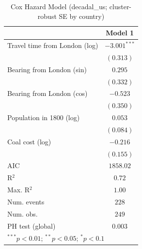 
\begin{table}
\begin{center}
\begin{tabular}{l c}
\hline
 & Model 1 \\
\hline
Travel time from London (log) & $-3.001^{***}$ \\
 & $(0.313)$ \\
Bearing from London (sin) & $0.295$ \\
 & $(0.332)$ \\
Bearing from London (cos) & $-0.523$ \\
 & $(0.350)$ \\
Population in 1800 (log) & $0.053$ \\
 & $(0.084)$ \\
Coal cost (log) & $-0.216$ \\
 & $(0.155)$ \\
\hline
AIC              & $1858.02$ \\
R$^2$            & $0.72$ \\
Max. R$^2$       & $1.00$ \\
Num. events      & $228$ \\
Num. obs.        & $249$ \\
PH test (global) & $0.003$ \\
\hline
\multicolumn{2}{l}{\scriptsize{$^{***}p<0.01$; $^{**}p<0.05$; $^{*}p<0.1$}}
\end{tabular}
\caption{Cox Hazard Model (decadal\_us; cluster-robust SE by country)}
\label{tab:cox_serious_decadal_us}
\end{center}
\end{table}
